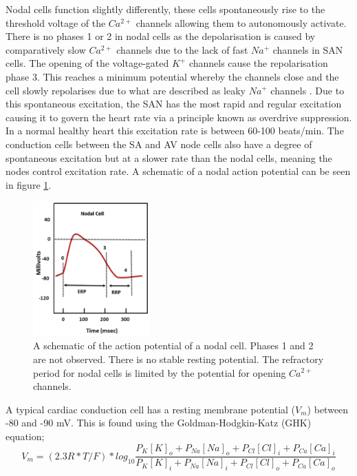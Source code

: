 Nodal cells function slightly differently, these cells spontaneously rise to the threshold voltage of the $Ca^{2+}$ channels allowing them to autonomously activate. There is no phases 1 or 2 in nodal cells as the depolarisation is caused by comparatively slow $Ca^{2+}$ channels due to the lack of fast $Na^+$ channels in SAN cells. The opening of the voltage-gated $K^+$ channels cause the repolarisation phase 3. This reaches a minimum potential whereby the channels close and the cell slowly repolarises due to what are described as leaky $Na^+$ channels \citep{ConductionSystem}. Due to this spontaneous excitation, the SAN has the most rapid and regular excitation causing it to govern the heart rate via a principle known as overdrive suppression. In a normal healthy heart this excitation rate is between 60-100 beats/min. The conduction cells between the SA and AV node cells also have a degree of spontaneous excitation but at a slower rate than the nodal cells, meaning the nodes control excitation rate. A schematic of a nodal action potential can be seen in figure \ref{fig2.6}. \par
\begin{figure}
    \centering
    \includegraphics[width=0.4\textwidth]{images/nodalpotential.png}
    \caption{A schematic of the action potential of a nodal cell. Phases 1 and 2 are not observed. There is no stable resting potential. The refractory period for nodal cells is limited by the potential for opening $Ca^{2+}$ channels. \citep{ConductionSystem}}
    \label{fig2.6}
\end{figure}
\newpage
A typical cardiac conduction cell has a resting membrane potential ($V_m$) between -80 and -90 mV. This is found using the Goldman-Hodgkin-Katz (GHK) equation;
\begin{equation}
    V_m = (2.3R*T/F)*log_{10}\frac{P_K[K]_o + P_{Na}[Na]_o + P_{Cl}[Cl]_i + P_{Ca}[Ca]_i}{P_K[K]_i + P_{Na}[Na]_i + P_{Cl}[Cl]_o + P_{Ca}[Ca]_o}
    \label{eq2.2}
\end{equation}

